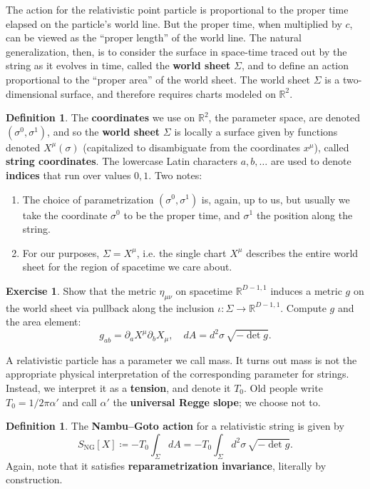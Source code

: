 \documentclass{report}
\theoremstyle{plain}
\theoremstyle{definition}
\newtheorem{definition}[theorem]{Definition}
\newtheorem{exercise}{Exercise}[section]
\theoremstyle{remark}
\newcommand{\di}{\partial}
\newcommand{\bR}{\mathbb{R}}
\begin{document}
The action for the relativistic point particle is proportional to the
proper time elapsed on the particle's world line. But the proper time,
when multiplied by $c$, can be viewed as the ``proper length'' of the
world line. The natural generalization, then, is to consider the
surface in space-time traced out by the string as it evolves in time,
called the {\bf world sheet} $\Sigma$, and to define an action
proportional to the ``proper area'' of the world sheet. The world
sheet $\Sigma$ is a two-dimensional surface, and therefore requires
charts modeled on $\bR^2$.

\begin{definition}
  The {\bf coordinates} we use on $\bR^2$, the parameter space, are
  denoted $(\sigma^0, \sigma^1)$, and so the {\bf world sheet}
  $\Sigma$ is locally a surface given by functions denoted
  $X^\mu(\sigma)$ (capitalized to disambiguate from the coordinates
  $x^\mu$), called {\bf string coordinates}. The lowercase Latin
  characters $a, b, \ldots$ are used to denote {\bf indices} that run
  over values $0,1$. Two notes:
  \begin{enumerate}
  \item The choice of parametrization $(\sigma^0, \sigma^1)$ is,
    again, up to us, but usually we take the coordinate $\sigma^0$ to
    be the proper time, and $\sigma^1$ the position along the string.
  \item For our purposes, $\Sigma = X^\mu$, i.e. the single chart
    $X^\mu$ describes the entire world sheet for the region of
    spacetime we care about.
  \end{enumerate}
\end{definition}

\begin{exercise}
  Show that the metric $\eta_{\mu\nu}$ on spacetime $\bR^{D-1,1}$
  induces a metric $g$ on the world sheet via pullback along the
  inclusion $\iota\colon \Sigma \to \bR^{D-1,1}$. Compute $g$ and the
  area element:
  \[ g_{ab} = \di_a X^\mu \di_b X_\mu, \quad dA =  d^2\sigma \, \sqrt{-\det g}. \]
\end{exercise}

A relativistic particle has a parameter we call mass. It turns out
mass is not the appropriate physical interpretation of the
corresponding parameter for strings. Instead, we interpret it as a
{\bf tension}, and denote it $T_0$. Old people write $T_0 = 1/2\pi
\alpha'$ and call $\alpha'$ the {\bf universal Regge slope}; we choose
not to.

\begin{definition}
  The {\bf Nambu--Goto action} for a relativistic string is given by
  \[ S_{\text{NG}}[X] \coloneqq -T_0 \int_\Sigma dA = -T_0 \int_\Sigma d^2\sigma \, \sqrt{-\det g}. \]
  Again, note that it satisfies {\bf reparametrization invariance},
  literally by construction.
\end{definition}
\end{document}
